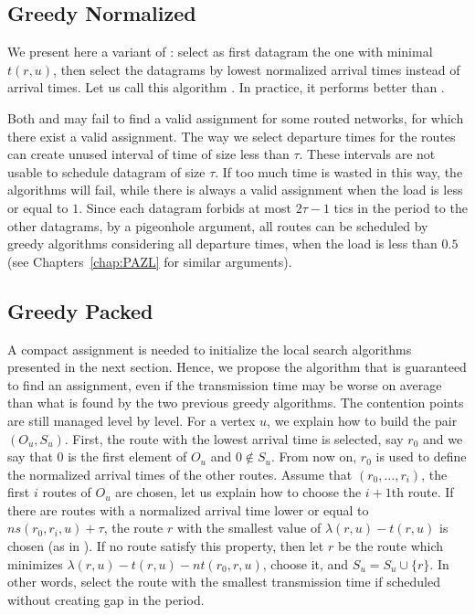 \subsection{Greedy Normalized}

We present here a variant of \greedydeadline: select as first datagram the one with minimal $t(r,u)$, then select the datagrams by lowest normalized arrival times instead of arrival times. Let us call this algorithm
\greedynormalized. In practice, it performs better than \greedydeadline.

Both \greedydeadline and \greedynormalized may fail to find a valid assignment for some routed networks, for which there exist a valid assignment. The way we select departure times for the routes can create unused interval of time of size less than $\tau$. These intervals are not usable to schedule datagram of size $\tau$. If too much time is wasted in this way, the algorithms will fail, while there is always a valid assignment when the load is less or equal to $1$. Since each datagram forbids at most $2\tau -1$ tics in the period to the other datagrams, by a pigeonhole argument, all routes can be scheduled by greedy algorithms considering all departure times, when the load is less than $0.5$ (see Chapters~\ref{chap:PAZL} for similar arguments).



\subsection{Greedy Packed}


A compact assignment is needed to initialize the local search algorithms presented in the next section. Hence, we propose the \greedypacked algorithm that is guaranteed to find an assignment, even if the transmission time may be worse on average than what is found by the two previous greedy algorithms.
The contention points are still managed level by level. For a vertex $u$, we explain how to build the pair $(O_u,S_u)$. First, the route with the lowest arrival time is selected, say $r_0$ and we say that $0$ is the first element of $O_u$ and $0 \notin S_u$. From now on, $r_0$ is used to define the normalized arrival times of the other routes. Assume that $(r_0,\dots,r_i)$, the first $i$ routes of $O_u$ are chosen, let us explain how to choose the $i+1$th route. If there are routes with a normalized arrival time lower or equal to $ns(r_0,r_i,u)+\tau$, the route $r$ with the smallest value of $\lambda(r,u) - t(r,u)$ is chosen (as in \greedynormalized). If no route satisfy this property, then let $r$ be the route which minimizes $\lambda(r,u) - t(r,u) - nt(r_0,r,u)$, choose it, and $S_u = S_u \cup \{r\}$. In other words, select the route with the smallest transmission time if scheduled without creating gap in the period.


